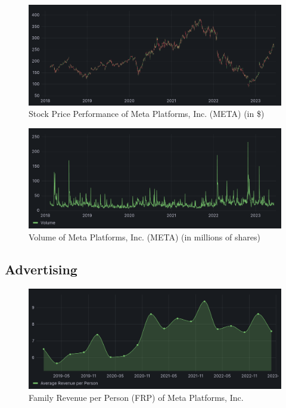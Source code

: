 \documentclass[12pt, a4paper]{article}
\begin{document}
\begin{figure}[H]
    \centering
    \includegraphics[width=1.00\textwidth]{stock-price}
    \caption{Stock Price Performance of Meta Platforms, Inc. (META) (in
    \$)\cite{stockPrice}}
    \label{fig:stock-price}
\end{figure}

\begin{figure}[H]
    \centering
    \includegraphics[width=1.00\textwidth]{volume}
    \caption{Volume of Meta Platforms, Inc. (META) (in millions of
    shares)\cite{stockPrice}}
    \label{fig:volume}
\end{figure}

\subsection*{Advertising}

\begin{figure}[H]
    \centering
    \includegraphics[width=1.00\textwidth]{family-revenue-per-person}
    \caption{Family Revenue per Person (FRP) of Meta Platforms,
    Inc.\cite{2023q1,2021q2Slides,2019q4Slides}}
    \label{fig:family-revenue-per-person}
\end{figure}
\end{document}
